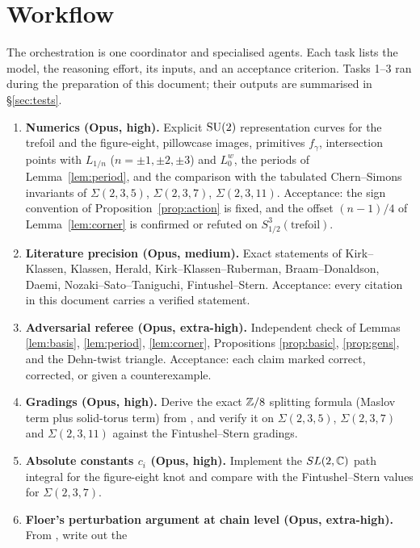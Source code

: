 \section{Workflow}\label{sec:workflow}
The orchestration is one coordinator and specialised agents.  Each task lists the model, the reasoning effort,
its inputs, and an acceptance criterion.  Tasks 1--3 ran during the preparation of this document; their outputs
are summarised in \S\ref{sec:tests}.

\begin{enumerate}[leftmargin=2em]
\item \textbf{Numerics (Opus, high).}  Explicit $\operatorname{SU}(2)$ representation curves for the trefoil and the figure-eight,
pillowcase images, primitives $f_\gamma$, intersection points with $L_{1/n}$ ($n=\pm1,\pm2,\pm3$) and $L^w_0$, the
periods of Lemma~\ref{lem:period}, and the comparison with the tabulated Chern--Simons invariants of
$\Sigma(2,3,5)$, $\Sigma(2,3,7)$, $\Sigma(2,3,11)$.  Acceptance: the sign convention of
Proposition~\ref{prop:action} is fixed, and the offset $(n-1)/4$ of Lemma~\ref{lem:corner} is confirmed or refuted
on $S^3_{1/2}(\text{trefoil})$.
\item \textbf{Literature precision (Opus, medium).}  Exact statements of Kirk--Klassen, Klassen, Herald,
Kirk--Klassen--Ruberman, Braam--Donaldson, Daemi, Nozaki--Sato--Taniguchi, Fintushel--Stern.  Acceptance: every
citation in this document carries a verified statement.
\item \textbf{Adversarial referee (Opus, extra-high).}  Independent check of Lemmas \ref{lem:basis},
\ref{lem:period}, \ref{lem:corner}, Propositions \ref{prop:basic}, \ref{prop:gens}, and the Dehn-twist triangle.
Acceptance: each claim marked correct, corrected, or given a counterexample.
\item \textbf{Gradings (Opus, high).}  Derive the exact $\mathbb{Z}/8$ splitting formula (Maslov term plus solid-torus
term) from \cite{KKR}, and verify it on $\Sigma(2,3,5)$, $\Sigma(2,3,7)$ and $\Sigma(2,3,11)$ against the
Fintushel--Stern gradings.
\item \textbf{Absolute constants $c_i$ (Opus, high).}  Implement the $SL(2,\mathbb{C})$ path integral for the figure-eight
knot and compare with the Fintushel--Stern values for $\Sigma(2,3,7)$.
\item \textbf{Floer's perturbation argument at chain level (Opus, extra-high).}  From \cite{BD}, write out the

\end{enumerate}
